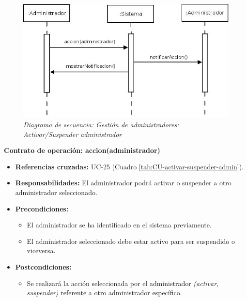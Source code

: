 \begin{figure}[H]
\centering
  \includegraphics[scale=.50]{img/secuencias/gestion-administradores-activar-suspender.jpeg}
  \caption{\textit{Diagrama de secuencia: Gestión de administradores: Activar/Suspender administrador}}
  \label{fig:secuencia-gestion-administradores-activar-suspender}
\end{figure}

\textbf{Contrato de operación: accion(administrador)}
\begin{itemize}
\item \textbf{Referencias cruzadas:} UC-25 (Cuadro \ref{tab:CU-activar-suspender-admin}).
\item \textbf{Responsabilidades:} El administrador podrá activar o suspender a otro administrador seleccionado.
\item \textbf{Precondiciones:} 
 \begin{itemize}
\item El administrador se ha identificado en el sistema previamente.
\item El administrador seleccionado debe estar activo para ser suspendido o viceversa.
\end {itemize}
\item \textbf{Postcondiciones:} 
 \begin{itemize}
\item Se realizará la acción seleccionada por el administrador \textit{(activar, suspender)} referente a otro administrador específico.
\end {itemize}
\end {itemize}

